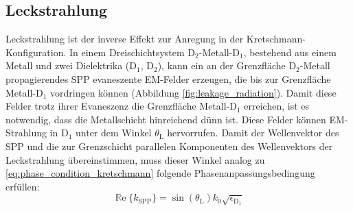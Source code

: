 \documentclass[a4paper, titlepage,  ngerman, fullpage]{book}
\renewcommand{\Re}{\operatorname{\mathbb{R}e}}
\begin{document}
	\subsection{Leckstrahlung}
	\label{sec:leakage_radiation}
	Leckstrahlung ist der inverse Effekt zur Anregung in der Kretschmann-Konfiguration. In einem Dreischichtsystem $\mathrm{D}_2$-Metall-$\mathrm{D}_1$, bestehend aus einem Metall und zwei Dielektrika ($\mathrm{D}_1$, $\mathrm{D}_2$), kann ein an der Grenzfläche $\mathrm{D}_2$-Metall propagierendes SPP evaneszente EM-Felder erzeugen, die bis zur Grenzfläche Metall-$\mathrm{D}_1$ vordringen können (Abbildung \ref{fig:leakage_radiation}). Damit diese Felder trotz ihrer Evaneszenz die Grenzfläche Metall-$\mathrm{D}_1$ erreichen, ist es notwendig, dass die Metallschicht hinreichend dünn ist. Diese Felder können EM-Strahlung in $\mathrm{D}_1$ unter dem Winkel $\theta_\mathrm{L}$ hervorrufen. Damit der Wellenvektor des SPP und die zur Grenzschicht parallelen Komponenten des Wellenvektors der Leckstrahlung übereinstimmen, muss dieser Winkel analog zu \eqref{eq:phase_condition_kretschmann} folgende Phasenanpassungsbedingung erfüllen:
	\begin{equation}
		\label{eq:phase_condition}
		\boxed{\Re\{k_{\mathrm{SPP}}\}=\sin(\theta_\mathrm{L}) k_0 \sqrt{\epsilon_{\mathrm{D}_1}}}
	\end{equation}
	
\end{document}
